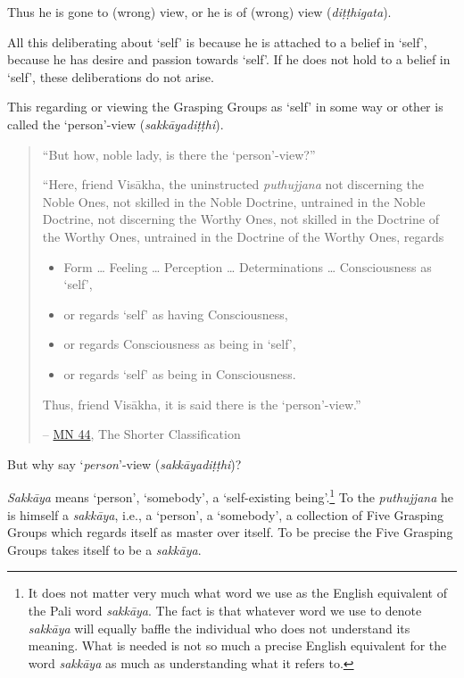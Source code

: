 Thus he is gone to (wrong) view, or he is of (wrong) view (\textit{diṭṭhigata}).

All this deliberating about `self' is because he is attached to a belief in `self', because he has desire and passion towards `self'. If he does not hold to a belief in `self', these deliberations do not arise.

This regarding or viewing the Grasping Groups as `self' in some way or other is called the `person'-view (\textit{sakkāyadiṭṭhi}).

\begin{quote}
``But how, noble lady, is there the `person'-view?''

``Here, friend Visākha, the uninstructed \textit{puthujjana} not discerning the Noble Ones, not skilled in the Noble Doctrine, untrained in the Noble Doctrine, not discerning the Worthy Ones, not skilled in the Doctrine of the Worthy Ones, untrained in the Doctrine of the Worthy Ones, regards

\begin{itemize}
\item
  Form \ldots{} Feeling \ldots{} Perception \ldots{} Determinations \ldots{} Consciousness as `self',
\item
  or regards `self' as having Consciousness,
\item
  or regards Consciousness as being in `self',
\item
  or regards `self' as being in Consciousness.
\end{itemize}

Thus, friend Visākha, it is said there is the `person'-view.''

 -- \href{https://suttacentral.net/mn44/en/sujato}{MN 44}, The Shorter Classification
\end{quote}

But why say `\emph{person}'-view (\textit{sakkāyadiṭṭhi})?

\textit{Sakkāya} means `person', `somebody', a `self-existing being'.\footnote{It does not matter very much what word we use as the English equivalent of the Pali word \textit{sakkāya}. The fact is that whatever word we use to denote \textit{sakkāya} will equally baffle the individual who does not understand its meaning. What is needed is not so much a precise English equivalent for the word \textit{sakkāya} as much as understanding what it refers to.} To the \textit{puthujjana} he is himself a \textit{sakkāya}, i.e., a `person', a `somebody', a collection of Five Grasping Groups which regards itself as master over itself. To be precise the Five Grasping Groups takes itself to be a \textit{sakkāya}.

